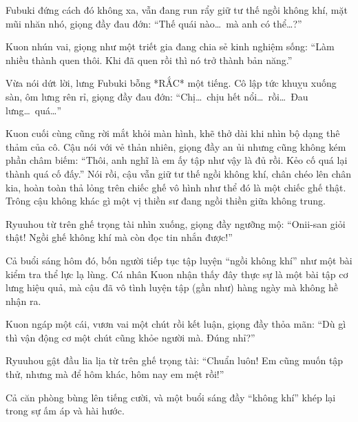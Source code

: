 \documentclass[../main.tex]{subfiles}
\begin{document}
Fubuki đứng cách đó không xa, vẫn đang run rẩy giữ tư thế ngồi không khí, mặt mũi nhăn nhó, giọng đầy đau đớn: ``Thế quái nào\dots\ mà anh có thể\dots?''

Kuon nhún vai, giọng như một triết gia đang chia sẻ kinh nghiệm sống: ``Làm nhiều thành quen thôi. Khi đã quen rồi thì nó trở thành bản năng.''

Vừa nói dứt lời, lưng Fubuki bỗng *RẮC* một tiếng. Cô lập tức khuỵu xuống sàn, ôm lưng rên rỉ, giọng đầy đau đớn: ``Chị\dots\ chịu hết nổi\dots\ rồi\dots\ Đau lưng\dots\ quá\dots''

Kuon cuối cùng cũng rời mắt khỏi màn hình, khẽ thở dài khi nhìn bộ dạng thê thảm của cô. Cậu nói với vẻ thản nhiên, giọng đầy an ủi nhưng cũng không kém phần châm biếm: ``Thôi, anh nghĩ là em ấy tập như vậy là đủ rồi. Kẻo cố quá lại thành quá cố đấy.'' Nói rồi, cậu vẫn giữ tư thế ngồi không khí, chân chéo lên chân kia, hoàn toàn thả lỏng trên chiếc ghế vô hình như thể đó là một chiếc ghế thật. Trông cậu không khác gì một vị thiền sư đang ngồi thiền giữa không trung.

Ryuuhou từ trên ghế trọng tài nhìn xuống, giọng đầy ngưỡng mộ: ``Onii-san giỏi thật! Ngồi ghế không khí mà còn đọc tin nhắn được!''

Cả buổi sáng hôm đó, bốn người tiếp tục tập luyện ``ngồi không khí'' như một bài kiểm tra thể lực lạ lùng. Cá nhân Kuon nhận thấy đây thực sự là một bài tập cơ lưng hiệu quả, mà cậu đã vô tình luyện tập (gần như) hàng ngày mà không hề nhận ra.

Kuon ngáp một cái, vươn vai một chút rồi kết luận, giọng đầy thỏa mãn: ``Dù gì thì vận động cơ một chút cũng khỏe người mà. Đúng nhỉ?''

Ryuuhou gật đầu lia lịa từ trên ghế trọng tài: ``Chuẩn luôn! Em cũng muốn tập thử, nhưng mà để hôm khác, hôm nay em mệt rồi!''

Cả căn phòng bùng lên tiếng cười, và một buổi sáng đầy ``không khí'' khép lại trong sự ấm áp và hài hước.
\end{document}
